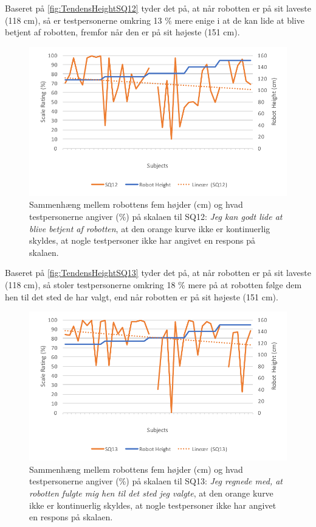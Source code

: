 \noindent
%
Baseret på \autoref{fig:TendensHeightSQ12} tyder det på, at når robotten er på sit laveste (118 cm), så er testpersonerne omkring 13 \% mere enige i at de kan lide at blive betjent af robotten, fremfor når den er på sit højeste (151 cm). 
%
\begin{figure}[H]
\centering
\includegraphics[width=\textwidth]{Figure/DatabehandlingSkalaer/TendensHeight/HeightSQ12}
\caption{Sammenhæng mellem robottens fem højder (cm) og hvad testpersonerne angiver (\%) på skalaen til SQ12: \textit{Jeg kan godt lide at blive betjent af robotten}, at den orange kurve ikke er kontinuerlig skyldes, at nogle testpersoner ikke har angivet en respons på skalaen.}
\label{fig:TendensHeightSQ12}
\end{figure}
\noindent
%
Baseret på \autoref{fig:TendensHeightSQ13} tyder det på, at når robotten er på sit laveste (118 cm), så stoler testpersonerne omkring 18 \% mere på at robotten følge dem hen til det sted de har valgt, end når robotten er på sit højeste (151 cm). 
%
\begin{figure}[H]
\centering
\includegraphics[width=\textwidth]{Figure/DatabehandlingSkalaer/TendensHeight/HeightSQ13}
\caption{Sammenhæng mellem robottens fem højder (cm) og hvad testpersonerne angiver (\%) på skalaen til SQ13: \textit{Jeg regnede med, at robotten fulgte mig hen til det sted jeg valgte}, at den orange kurve ikke er kontinuerlig skyldes, at nogle testpersoner ikke har angivet en respons på skalaen.}
\label{fig:TendensHeightSQ13}
\end{figure}
